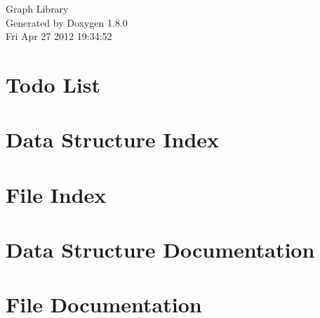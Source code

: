 \documentclass{book}
\begin{document}
\hypersetup{pageanchor=false,citecolor=blue}
\begin{titlepage}
\vspace*{7cm}
\begin{center}
{\Large Graph Library }\\
\vspace*{1cm}
{\large Generated by Doxygen 1.8.0}\\
\vspace*{0.5cm}
{\small Fri Apr 27 2012 19:34:52}\\
\end{center}
\end{titlepage}
\clearemptydoublepage
{}
\tableofcontents
\clearemptydoublepage
{}
\hypersetup{pageanchor=true,citecolor=blue}
\chapter{Todo List}
\label{todo}
\hypertarget{todo}{}

\chapter{Data Structure Index}

\chapter{File Index}

\chapter{Data Structure Documentation}







\chapter{File Documentation}





















\printindex
\end{document}
